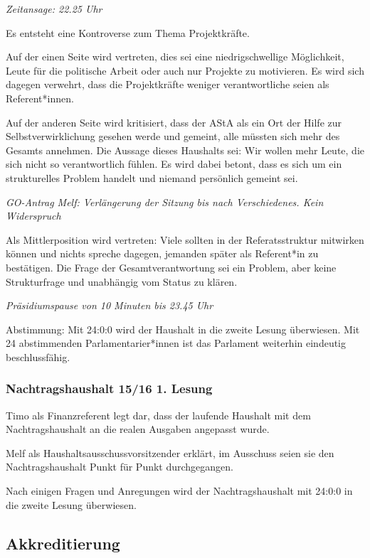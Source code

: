 \documentclass[ngerman,headheight=70pt]{scrartcl}
\begin{document}
    \textit{Zeitansage: 22.25 Uhr}

    Es entsteht eine Kontroverse zum Thema Projektkräfte.

    Auf der einen Seite wird vertreten, dies sei eine niedrigschwellige
    Möglichkeit, Leute für die politische Arbeit oder auch nur Projekte zu
    motivieren. Es wird sich dagegen verwehrt, dass die Projektkräfte weniger
    verantwortliche seien als Referent*innen.

    Auf der anderen Seite wird kritisiert, dass der AStA als ein Ort der Hilfe
    zur Selbstverwirklichung gesehen werde und gemeint, alle müssten sich mehr
    des Gesamts annehmen. Die Aussage dieses Haushalts sei: Wir wollen mehr
    Leute, die sich nicht so verantwortlich fühlen. Es wird dabei betont, dass
    es sich um ein strukturelles Problem handelt und niemand persönlich gemeint
    sei.

    \textit{GO-Antrag Melf: Verlängerung der Sitzung bis nach Verschiedenes.
    Kein Widerspruch}

    Als Mittlerposition wird vertreten: Viele sollten in der Referatsstruktur
    mitwirken können und nichts spreche dagegen, jemanden später als
    Referent*in zu bestätigen. Die Frage der Gesamtverantwortung sei ein
    Problem, aber keine Strukturfrage und unabhängig vom Status zu klären.

    \textit{Präsidiumspause von 10 Minuten bis 23.45 Uhr}

    Abstimmung: Mit 24:0:0 wird der Haushalt in die zweite Lesung überwiesen.
    Mit 24 abstimmenden Parlamentarier*innen ist das Parlament weiterhin
    eindeutig beschlussfähig.

    \subsubsection{Nachtragshaushalt 15/16 1. Lesung}

    Timo als Finanzreferent legt dar, dass der laufende Haushalt mit dem
    Nachtragshaushalt an die realen Ausgaben angepasst wurde.

    Melf als Haushaltsausschussvorsitzender erklärt, im Ausschuss seien sie den
    Nachtragshaushalt Punkt für Punkt durchgegangen.

    Nach einigen Fragen und Anregungen wird der Nachtragshaushalt mit 24:0:0 in
    die zweite Lesung überwiesen.

    \subsection{Akkreditierung}
\end{document}

